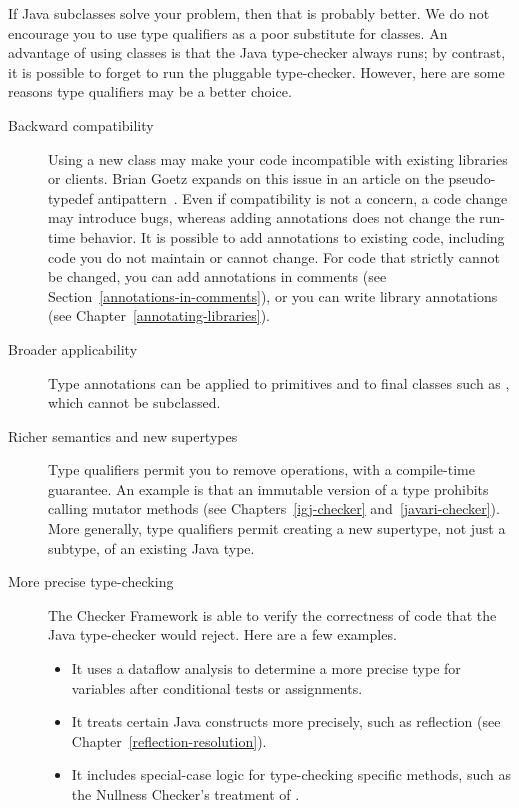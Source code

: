 If  Java subclasses solve your problem, then that is probably better.
We do not encourage you to use type qualifiers as a poor substitute for
classes.  An advantage of using classes is that the Java type-checker
always runs; by contrast, it is possible to forget to run the pluggable
type-checker.  However, here are some reasons type qualifiers may be a
better choice.

\begin{description}

\item[Backward compatibility]
Using a new class may make your code incompatible with existing libraries or
clients.  Brian Goetz expands on this issue in an article on the
pseudo-typedef antipattern~\cite{Goetz2006:typedef}.  Even if compatibility
is not a concern, a code change may introduce bugs, whereas adding
annotations does not change the run-time behavior.  It is possible to add
annotations to existing code, including code you do not maintain or cannot
change.  For code that strictly cannot be changed, you can add
annotations in comments (see Section~\ref{annotations-in-comments}), or you
can write library annotations (see Chapter~\ref{annotating-libraries}).

\item[Broader applicability]
Type annotations can be applied to primitives and to final classes such as
, which cannot be subclassed.

\item[Richer semantics and new supertypes]
Type qualifiers permit you to remove operations, with a compile-time
guarantee.  An example is that an immutable version of a type prohibits
calling mutator methods
(see Chapters~\ref{igj-checker} and~\ref{javari-checker}).  More
generally, type qualifiers permit creating a new supertype, not just a
subtype, of an existing Java type.

\item[More precise type-checking]
The Checker Framework is able to verify the correctness of code that the
Java type-checker would reject.  Here are a few examples.
\begin{itemize}
\item
  It uses a dataflow analysis to determine a more precise type for
  variables after conditional tests or assignments.
\item
  It treats certain Java constructs more precisely, such as
  reflection (see Chapter~\ref{reflection-resolution}).
\item
  It includes special-case logic for type-checking specific methods, such
  as the Nullness Checker's treatment of .
\end{itemize}



\end{description}
